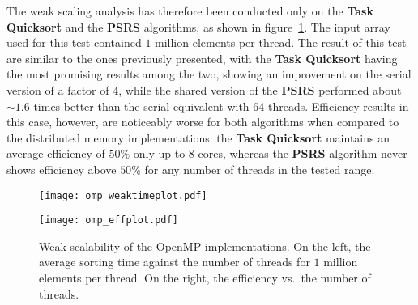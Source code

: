 \documentclass[../main.tex]{subfiles}
\begin{document}
The weak scaling analysis has therefore been conducted only on the \textbf{Task Quicksort} and the \textbf{PSRS} algorithms, as shown in figure~\ref{fig:weak_omp}. The input array used for this test contained $1$ million elements per thread. The result of this test are similar to the ones previously presented, with the \textbf{Task Quicksort} having the most promising results among the two, showing an improvement on the serial version of a factor of $4$, while the shared version of the \textbf{PSRS} performed about $\sim 1.6$ times better than the serial equivalent with $64$ threads. Efficiency results in this case, however, are noticeably worse for both algorithms when compared to the distributed memory implementations: the \textbf{Task Quicksort} maintains an average efficiency of $50\%$ only up to $8$ cores, whereas the \textbf{PSRS} algorithm never shows efficiency above $50\%$ for any number of threads in the tested range.\\
\begin{figure}[t]
    \centering
    \begin{minipage}{0.50\textwidth}
        \centering
        \texttt{[image: omp\_weaktimeplot.pdf]}
    \end{minipage}\hfill
    \begin{minipage}{0.50\textwidth}
        \centering
        \texttt{[image: omp\_effplot.pdf]}
    \end{minipage}

    \caption{Weak scalability of the OpenMP implementations. On the left, the average sorting time against the number of threads for $1$ million elements per thread. On the right, the efficiency vs.\ the number of threads.}
    \label{fig:weak_omp}
\end{figure}
\end{document}
